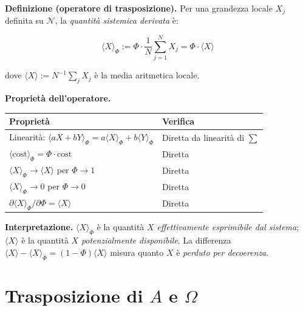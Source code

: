 \Hypoth{} \textbf{Definizione (operatore di trasposizione).} Per una
grandezza locale \(X_j\) definita su \(\mathcal{N}\), la \emph{quantità
sistemica derivata} è:

\[
\langle X \rangle_\Phi := \Phi \cdot \frac{1}{N} \sum_{j=1}^{N} X_j = \Phi \cdot \langle X \rangle
\]

dove \(\langle X \rangle := N^{-1} \sum_j X_j\) è la media aritmetica
locale.

\Proved{} \textbf{Proprietà dell'operatore.}

{\def\LTcaptype{none} %
{\small\begin{longtable}[]{@{}
  >{\raggedright\arraybackslash}p{}
  >{\raggedright\arraybackslash}p{}@{}}
\toprule\noalign{}
\begin{minipage}[b]{\linewidth}\raggedright
Proprietà
\end{minipage} & \begin{minipage}[b]{\linewidth}\raggedright
Verifica
\end{minipage} \\
\midrule\noalign{}
\endhead
\bottomrule\noalign{}
\endlastfoot
Linearità:
\(\langle aX + bY \rangle_\Phi = a\langle X\rangle_\Phi + b\langle Y\rangle_\Phi\)
& Diretta da linearità di \(\sum\) \\
\(\langle\text{cost}\rangle_\Phi = \Phi \cdot \text{cost}\) & Diretta \\
\(\langle X \rangle_\Phi \to \langle X \rangle\) per \(\Phi \to 1\) &
Diretta \\
\(\langle X \rangle_\Phi \to 0\) per \(\Phi \to 0\) & Diretta \\
\(\partial \langle X \rangle_\Phi / \partial \Phi = \langle X \rangle\)
& Diretta \\
\end{longtable}}
}

\Hypoth{} \textbf{Interpretazione.} \(\langle X \rangle_\Phi\) è la
quantità \(X\) \emph{effettivamente esprimibile dal sistema};
\(\langle X \rangle\) è la quantità \(X\) \emph{potenzialmente
disponibile}. La differenza
\(\langle X \rangle - \langle X \rangle_\Phi = (1-\Phi)\langle X \rangle\)
misura quanto \(X\) è \emph{perduto per decoerenza}.



\section{\texorpdfstring{Trasposizione di \(A\) e
\(\Omega\)}{Trasposizione di A e \textbackslash Omega}}\label{trasposizione-di-a-e-omega}

